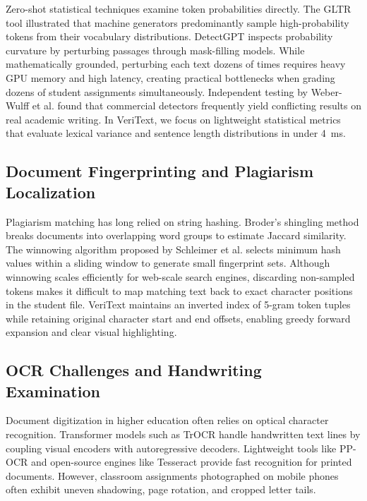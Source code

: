 \documentclass[conference]{IEEEtran}
\begin{document}
Zero-shot statistical techniques examine token probabilities directly. The GLTR tool \cite{gehrmann2019gltr} illustrated that machine generators predominantly sample high-probability tokens from their vocabulary distributions. DetectGPT \cite{mitchell2023detectgpt} inspects probability curvature by perturbing passages through mask-filling models. While mathematically grounded, perturbing each text dozens of times requires heavy GPU memory and high latency, creating practical bottlenecks when grading dozens of student assignments simultaneously. Independent testing by Weber-Wulff et al. \cite{weber2023testing} found that commercial detectors frequently yield conflicting results on real academic writing. In VeriText, we focus on lightweight statistical metrics that evaluate lexical variance and sentence length distributions in under 4~ms.

\subsection{Document Fingerprinting and Plagiarism Localization}
Plagiarism matching has long relied on string hashing. Broder's shingling method \cite{broder1997resemblance} breaks documents into overlapping word groups to estimate Jaccard similarity. The winnowing algorithm proposed by Schleimer et al. \cite{schleimer2003winnowing} selects minimum hash values within a sliding window to generate small fingerprint sets. Although winnowing scales efficiently for web-scale search engines, discarding non-sampled tokens makes it difficult to map matching text back to exact character positions in the student file. VeriText maintains an inverted index of 5-gram token tuples while retaining original character start and end offsets, enabling greedy forward expansion and clear visual highlighting.

\subsection{OCR Challenges and Handwriting Examination}
Document digitization in higher education often relies on optical character recognition. Transformer models such as TrOCR \cite{li2023trocr} handle handwritten text lines by coupling visual encoders with autoregressive decoders. Lightweight tools like PP-OCR \cite{du2020ppocr} and open-source engines like Tesseract \cite{smith2007overview} provide fast recognition for printed documents. However, classroom assignments photographed on mobile phones often exhibit uneven shadowing, page rotation, and cropped letter tails.
\end{document}
